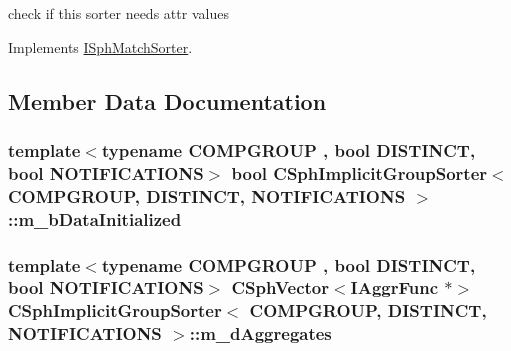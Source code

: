 check if this sorter needs attr values 



Implements \hyperlink{classISphMatchSorter_ae44238460e92263e6dda7de35e24d32c}{I\-Sph\-Match\-Sorter}.



\subsection{Member Data Documentation}
\hypertarget{classCSphImplicitGroupSorter_aae070f7e16ffe91b39d706da20c249f8}{
\subsubsection[{m\-\_\-b\-Data\-Initialized}]{\setlength{\rightskip}{0pt plus 5cm}template$<$typename C\-O\-M\-P\-G\-R\-O\-U\-P , bool D\-I\-S\-T\-I\-N\-C\-T, bool N\-O\-T\-I\-F\-I\-C\-A\-T\-I\-O\-N\-S$>$ bool {\bf C\-Sph\-Implicit\-Group\-Sorter}$<$ C\-O\-M\-P\-G\-R\-O\-U\-P, D\-I\-S\-T\-I\-N\-C\-T, N\-O\-T\-I\-F\-I\-C\-A\-T\-I\-O\-N\-S $>$\-::m\-\_\-b\-Data\-Initialized\hspace{0.3cm}{\ttfamily [protected]}}}\label{classCSphImplicitGroupSorter_aae070f7e16ffe91b39d706da20c249f8}
\hypertarget{classCSphImplicitGroupSorter_a9970bd32bde8634e4ad0839796422838}{
\subsubsection[{m\-\_\-d\-Aggregates}]{\setlength{\rightskip}{0pt plus 5cm}template$<$typename C\-O\-M\-P\-G\-R\-O\-U\-P , bool D\-I\-S\-T\-I\-N\-C\-T, bool N\-O\-T\-I\-F\-I\-C\-A\-T\-I\-O\-N\-S$>$ {\bf C\-Sph\-Vector}$<${\bf I\-Aggr\-Func} $\ast$$>$ {\bf C\-Sph\-Implicit\-Group\-Sorter}$<$ C\-O\-M\-P\-G\-R\-O\-U\-P, D\-I\-S\-T\-I\-N\-C\-T, N\-O\-T\-I\-F\-I\-C\-A\-T\-I\-O\-N\-S $>$\-::m\-\_\-d\-Aggregates\hspace{0.3cm}{\ttfamily [protected]}}}\label{classCSphImplicitGroupSorter_a9970bd32bde8634e4ad0839796422838}
